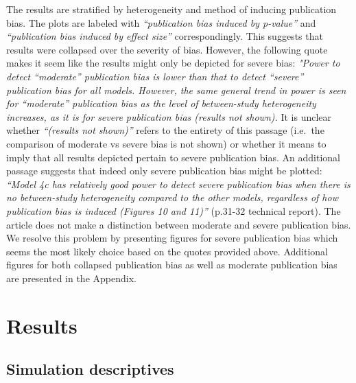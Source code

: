 \documentclass[
  english,
  doc,floatsintext,draftall]{apa6}
\begin{document}
The results are stratified by heterogeneity and method of inducing publication bias.
The plots are labeled with \emph{\enquote{publication bias induced by p-value}} and \emph{\enquote{publication bias induced by effect size}} correspondingly.
This suggests that results were collapsed over the severity of bias.
However, the following quote makes it seem like the results might only be depicted for severe bias:
\emph{"Power to detect \enquote{moderate} publication bias is lower than that to detect \enquote{severe} publication bias for all models. However, the same general trend in power is seen for \enquote{moderate} publication bias as the level of between-study heterogeneity increases, as it is for severe publication bias (results not shown).}
It is unclear whether \emph{\enquote{(results not shown)}} refers to the entirety of this passage (i.e.~the comparison of moderate vs severe bias is not shown) or whether it means to imply that all results depicted pertain to severe publication bias.
An additional passage suggests that indeed only severe publication bias might be plotted: \emph{\enquote{Model 4c has relatively good power to detect severe publication bias when there is no between-study heterogeneity compared to the other models, regardless of how publication bias is induced (Figures 10 and 11)}} (p.31-32 technical report). The article does not make a distinction between moderate and severe publication bias.
We resolve this problem by presenting figures for severe publication bias which seems the most likely choice based on the quotes provided above.
Additional figures for both collapsed publication bias as well as moderate publication bias are presented in the Appendix.

\hypertarget{results}{%
\section{Results}\label{results}}

\hypertarget{simulation-descriptives}{%
\subsection{Simulation descriptives}\label{simulation-descriptives}}
\end{document}
